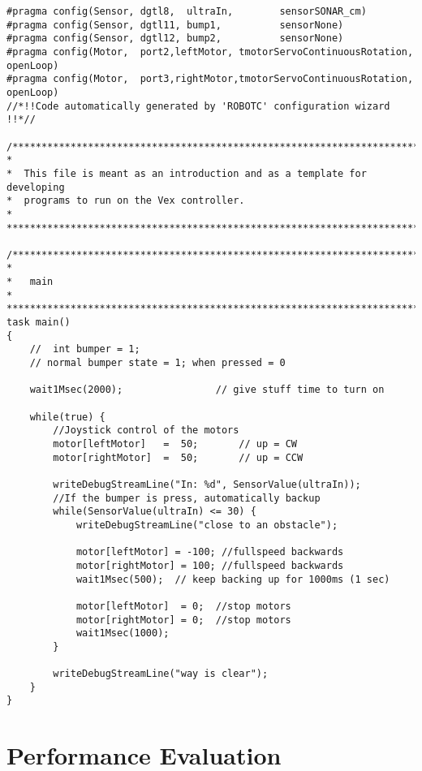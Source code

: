 \documentclass[12pt]{report}
\begin{document}
\lstset{language=C}
\begin{lstlisting}
#pragma config(Sensor, dgtl8,  ultraIn,        sensorSONAR_cm)
#pragma config(Sensor, dgtl11, bump1,          sensorNone)
#pragma config(Sensor, dgtl12, bump2,          sensorNone)
#pragma config(Motor,  port2,leftMotor, tmotorServoContinuousRotation, openLoop)
#pragma config(Motor,  port3,rightMotor,tmotorServoContinuousRotation, openLoop)
//*!!Code automatically generated by 'ROBOTC' configuration wizard               !!*//

/*******************************************************************************
*
*  This file is meant as an introduction and as a template for developing
*  programs to run on the Vex controller.
*
*******************************************************************************/

/*******************************************************************************
*
*	main
*
*******************************************************************************/
task main()
{
	//  int bumper = 1;	              
	// normal bumper state = 1; when pressed = 0

	wait1Msec(2000);    			// give stuff time to turn on

	while(true) {
		//Joystick control of the motors
		motor[leftMotor]   =  50;       // up = CW
		motor[rightMotor]  =  50;       // up = CCW

		writeDebugStreamLine("In: %d", SensorValue(ultraIn));
		//If the bumper is press, automatically backup
		while(SensorValue(ultraIn) <= 30) {
			writeDebugStreamLine("close to an obstacle");

			motor[leftMotor] = -100; //fullspeed backwards
			motor[rightMotor] = 100; //fullspeed backwards
			wait1Msec(500);  // keep backing up for 1000ms (1 sec)

			motor[leftMotor]  = 0;  //stop motors
			motor[rightMotor] = 0;  //stop motors
			wait1Msec(1000);
		}

		writeDebugStreamLine("way is clear");
	}
}

\end{lstlisting}

\section{Performance Evaluation}
\end{document}

